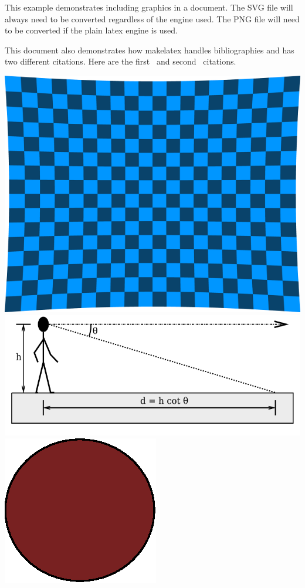 \documentclass[letterpaper,12pt]{article}
\begin{document}
This example demonstrates including graphics in a document. The SVG file will always need to be converted regardless of the engine used. The PNG file will need to be converted if the plain latex engine is used.

This document also demonstrates how makelatex handles bibliographies and has two different citations. Here are the first~\cite{chicago} and second~\cite{latexbook} citations.


\includegraphics[width=.5\textwidth]{checkerboard}
\includegraphics[width=\textwidth]{subdir/angle-of-decl}
\includegraphics[width=.1\textwidth]{red-circle}



\end{document}
